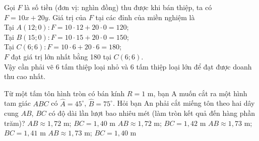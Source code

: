 \begin{ex}
{\begin{center}
\begin{tikzpicture}[x=0.5cm,y=0.5cm]
		\end{tikzpicture}
\end{center}
	Gọi $F$ là số tiền (đơn vị: nghìn đồng) thu được khi bán thiệp, ta có $F=10 x+20 y$.
	Giá trị của $F$ tại các đỉnh của miền nghiệm là \\
	Tại $A(12;0): F=10\cdot 12+20 \cdot 0=120$; \\
	Tại $B(15;0): F=10 \cdot 15+20\cdot 0=150$; \\
	Tại $C(6;6): F=10\cdot 6+20\cdot 6=180$; \\
	$F$ đạt giá trị lớn nhất bằng 180 tại $C(6 ; 6)$. \\
	Vậy cần phải vẽ $6$ tấm thiệp loại nhỏ và $6$ tấm thiệp loại lớn để đạt được doanh thu cao nhất.}
\end{ex}
\begin{ex}%
	Từ một tấm tôn hình tròn có bán kính $R=1$ m, bạn A muốn cắt ra một hình tam giác $ABC$ có $\widehat{A}=45^{\circ}$, $\widehat{B}=75^{\circ}$. Hỏi bạn An phải cắt miếng tôn theo hai dây cung $AB$, $BC$ có độ dài lần lượt bao nhiêu mét (làm tròn kết quả đến hàng phần trăm)?
	\choice       
	{$AB\approx 1,72$ m; $BC=1,40$ m}
	{$AB\approx 1,72$ m; $BC=1,42$ m}
	{\True $AB\approx 1,73$ m; $BC=1,41$ m}
	{$AB\approx 1,73$ m; $BC=1,40$ m}
\end{ex}	

